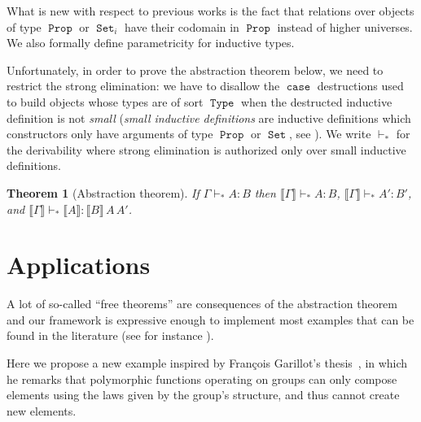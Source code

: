 \documentclass[conference,a4paper]{IEEEtran}
\newtheorem{thm}{Theorem}
\DeclareMathOperator{\Prop}{\mathtt{Prop}}
\DeclareMathOperator{\Type}{\mathtt{Type}}
\DeclareMathOperator{\Set}{\mathtt{Set}}
\DeclareMathOperator{\case}{\mathtt{case}}
\newcommand{\rel}[3]{{⟦#1⟧}\,{#2}\,{#3}}
\newcommand{\we}{⊢_{*}}
\begin{document}
What is new with respect to previous works is the fact that relations over objects
of type $\Prop$ or $\Set_i$ have their codomain in $\Prop$ instead of 
higher universes. We also formally define parametricity for inductive
types.

Unfortunately, in order to prove the abstraction
theorem below, we need to restrict the strong elimination: we have to disallow the $\case$ destructions 
used to build objects whose types are of sort $\Type$ when the destructed inductive 
definition is not \emph{small} (\emph{small inductive definitions} are inductive 
definitions which constructors only have arguments of type $\Prop$ or $\Set$, 
see  \cite{springerlink:10.1007/BFb0037116}). 
We write $\we$ for the derivability  where strong elimination is
authorized only over small 
inductive definitions. 

\begin{thm}[\label{AbstractionInductive}Abstraction theorem] 
  If $Γ \we A : B$ then $⟦Γ⟧ \we A : B$, $⟦Γ⟧ \we A' : B'$, and
      $⟦Γ⟧ \we ⟦A⟧ : \rel{B}{A}{A'}$.
\end{thm}

\section{Applications}\label{sec:application}

A lot of so-called ``free theorems'' are consequences of the 
abstraction theorem and our framework is expressive enough to 
implement most examples that can be found in the literature (see for instance \cite{Wadler89, DBLP:conf/icfp/BernardyJP10}). 

Here we propose a new example inspired by François Garillot's
thesis~\cite{Garillot11}, in which he remarks that polymorphic functions
operating on groups can only compose elements using the laws given by the
group's structure, and thus cannot create new elements. 
\end{document}
